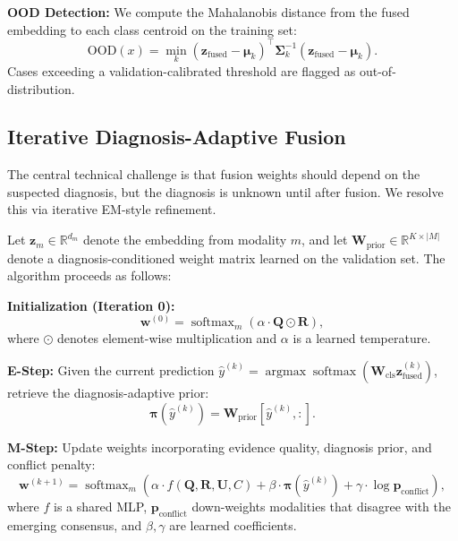 \documentclass[conference]{IEEEtran}
\DeclareMathOperator*{\argmax}{argmax}
\DeclareMathOperator*{\softmax}{softmax}
\begin{document}
\textbf{OOD Detection:} We compute the Mahalanobis distance from the fused embedding to each class centroid on the training set:
\begin{equation}
\text{OOD}(x) = \min_k (\mathbf{z}_{\text{fused}} - \boldsymbol{\mu}_k)^\top \boldsymbol{\Sigma}_k^{-1} (\mathbf{z}_{\text{fused}} - \boldsymbol{\mu}_k).
\end{equation}
Cases exceeding a validation-calibrated threshold are flagged as out-of-distribution.

\subsection{Iterative Diagnosis-Adaptive Fusion}
\label{sec:fusion}

The central technical challenge is that fusion weights should depend on the suspected diagnosis, but the diagnosis is unknown until after fusion. We resolve this via iterative EM-style refinement.

Let $\mathbf{z}_m \in \mathbb{R}^{d_m}$ denote the embedding from modality $m$, and let $\mathbf{W}_{\text{prior}} \in \mathbb{R}^{K \times |M|}$ denote a diagnosis-conditioned weight matrix learned on the validation set. The algorithm proceeds as follows:

\textbf{Initialization (Iteration 0):}
\begin{equation}
\mathbf{w}^{(0)} = \softmax_m\left( \alpha \cdot \mathbf{Q} \odot \mathbf{R} \right),
\end{equation}
where $\odot$ denotes element-wise multiplication and $\alpha$ is a learned temperature.

\textbf{E-Step:} Given the current prediction $\hat{y}^{(k)} = \argmax \softmax(\mathbf{W}_{\text{cls}} \mathbf{z}_{\text{fused}}^{(k)})$, retrieve the diagnosis-adaptive prior:
\begin{equation}
\boldsymbol{\pi}(\hat{y}^{(k)}) = \mathbf{W}_{\text{prior}}[\hat{y}^{(k)}, :].
\end{equation}

\textbf{M-Step:} Update weights incorporating evidence quality, diagnosis prior, and conflict penalty:
\begin{equation}
\mathbf{w}^{(k+1)} = \softmax_m\left( \alpha \cdot f(\mathbf{Q}, \mathbf{R}, \mathbf{U}, C) + \beta \cdot \boldsymbol{\pi}(\hat{y}^{(k)}) + \gamma \cdot \log \mathbf{p}_{\text{conflict}} \right),
\end{equation}
where $f$ is a shared MLP, $\mathbf{p}_{\text{conflict}}$ down-weights modalities that disagree with the emerging consensus, and $\beta, \gamma$ are learned coefficients.
\end{document}
